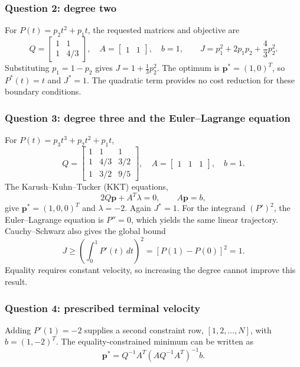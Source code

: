 \documentclass[12pt,a4paper,twoside]{article}
\begin{document}
\subsubsection{Question 2: degree two}
For $P(t)=p_2t^2+p_1t$, the requested matrices and objective are
\begin{equation}
Q=\begin{bmatrix}1&1\\1&4/3\end{bmatrix},\quad
A=\begin{bmatrix}1&1\end{bmatrix},\quad b=1,
\qquad J=p_1^2+2p_1p_2+\frac43p_2^2.
\end{equation}
Substituting $p_1=1-p_2$ gives $J=1+\tfrac13p_2^2$. The optimum is
$\boldsymbol p^*=(1,0)^T$, so $P^*(t)=t$ and $J^*=1$. The quadratic term
provides no cost reduction for these boundary conditions.

\subsubsection{Question 3: degree three and the Euler--Lagrange equation}
For $P(t)=p_3t^3+p_2t^2+p_1t$,
\begin{equation}
Q=\begin{bmatrix}1&1&1\\1&4/3&3/2\\1&3/2&9/5\end{bmatrix},\quad
A=\begin{bmatrix}1&1&1\end{bmatrix},\quad b=1.
\end{equation}
The Karush--Kuhn--Tucker (KKT) equations,
\begin{equation}
2Q\boldsymbol p+A^T\lambda=0,\qquad A\boldsymbol p=b,
\end{equation}
give $\boldsymbol p^*=(1,0,0)^T$ and $\lambda=-2$. Again $J^*=1$.
For the integrand $(P')^2$, the Euler--Lagrange equation is $P''=0$,
which yields the same linear trajectory. Cauchy--Schwarz also gives the global bound
\begin{equation}
J\geq\left(\int_0^1P'(t)\,dt\right)^2=[P(1)-P(0)]^2=1.
\end{equation}
Equality requires constant velocity, so increasing the degree cannot improve this result.

\subsubsection{Question 4: prescribed terminal velocity}
Adding $P'(1)=-2$ supplies a second constraint row, $[1,2,\ldots,N]$,
with $b=(1,-2)^T$. The equality-constrained minimum can be written as
\begin{equation}
\boldsymbol p^*=Q^{-1}A^T(AQ^{-1}A^T)^{-1}b.
\end{equation}
\end{document}
